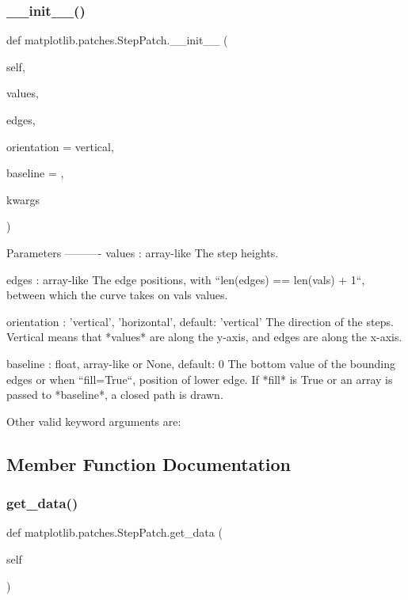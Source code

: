 \subsubsection{\texorpdfstring{\+\_\+\+\_\+init\+\_\+\+\_\+()}{\_\_init\_\_()}}
{\footnotesize\ttfamily def matplotlib.\+patches.\+Step\+Patch.\+\_\+\+\_\+init\+\_\+\+\_\+ (\begin{DoxyParamCaption}\item[{}]{self,  }\item[{}]{values,  }\item[{}]{edges,  }\item[{}]{orientation = {\ttfamily \textquotesingle{}vertical\textquotesingle{}},  }\item[{}]{baseline = {},  }\item[{}]{kwargs }\end{DoxyParamCaption})}

\begin{DoxyVerb}Parameters
----------
values : array-like
    The step heights.

edges : array-like
    The edge positions, with ``len(edges) == len(vals) + 1``,
    between which the curve takes on vals values.

orientation : {'vertical', 'horizontal'}, default: 'vertical'
    The direction of the steps. Vertical means that *values* are
    along the y-axis, and edges are along the x-axis.

baseline : float, array-like or None, default: 0
    The bottom value of the bounding edges or when
    ``fill=True``, position of lower edge. If *fill* is
    True or an array is passed to *baseline*, a closed
    path is drawn.

Other valid keyword arguments are:

\end{DoxyVerb}
 

\subsection{Member Function Documentation}
\mbox{\label{classmatplotlib_1_1patches_1_1StepPatch_affe718205aa1c9f0169432f1579507a6}} 
\subsubsection{\texorpdfstring{get\+\_\+data()}{get\_data()}}
{\footnotesize\ttfamily def matplotlib.\+patches.\+Step\+Patch.\+get\+\_\+data (\begin{DoxyParamCaption}\item[{}]{self }\end{DoxyParamCaption})}


